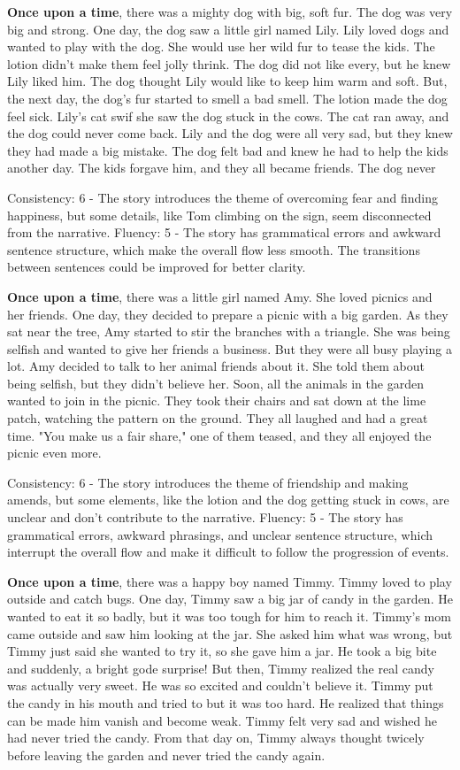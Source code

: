 \documentclass{article}
\begin{document}
\textbf{Once upon a time}, there was a mighty dog with big, soft fur. The dog was very big and strong. One day, the dog saw a little girl named Lily. Lily loved dogs and wanted to play with the dog. She would use her wild fur to tease the kids. The lotion didn't make them feel jolly thrink. The dog did not like every, but he knew Lily liked him. The dog thought Lily would like to keep him warm and soft. But, the next day, the dog's fur started to smell a bad smell. The lotion made the dog feel sick. Lily's cat swif she saw the dog  stuck in the cows. The cat ran away, and the dog could never come back. Lily and the dog were all very sad, but they knew they had made a big mistake. The dog felt bad and knew he had to help the kids another day. The kids forgave him, and they all became friends. The dog never

Consistency: 6 - The story introduces the theme of overcoming fear and finding happiness, but some details, like Tom climbing on the sign, seem disconnected from the narrative.
Fluency: 5 - The story has grammatical errors and awkward sentence structure, which make the overall flow less smooth. The transitions between sentences could be improved for better clarity.

\textbf{Once upon a time}, there was a little girl named Amy. She loved picnics and her friends. One day, they decided to prepare a picnic with a big garden. As they sat near the tree, Amy started to stir the branches with a triangle. She was being selfish and wanted to give her friends a business. But they were all busy playing a lot. Amy decided to talk to her animal friends about it. She told them about being selfish, but they didn't believe her. Soon, all the animals in the garden wanted to join in the picnic. They took their chairs and sat down at the lime patch, watching the pattern on the ground. They all laughed and had a great time. "You make us a fair share," one of them teased, and they all enjoyed the picnic even more.

Consistency: 6 - The story introduces the theme of friendship and making amends, but some elements, like the lotion and the dog getting stuck in cows, are unclear and don't contribute to the narrative.
Fluency: 5 - The story has grammatical errors, awkward phrasings, and unclear sentence structure, which interrupt the overall flow and make it difficult to follow the progression of events.

\textbf{Once upon a time}, there was a happy boy named Timmy. Timmy loved to play outside and catch bugs. One day, Timmy saw a big jar of candy in the garden. He wanted to eat it so badly, but it was too tough for him to reach it. Timmy's mom came outside and saw him looking at the jar. She asked him what was wrong, but Timmy just said she wanted to try it, so she gave him a jar. He took a big bite and suddenly, a bright gode surprise! But then, Timmy realized the real candy was actually very sweet. He was so excited and couldn't believe it. Timmy put the candy in his mouth and tried to but it was too hard. He realized that things can be made him vanish and become weak. Timmy felt very sad and wished he had never tried the candy. From that day on, Timmy always thought twicely before leaving the garden and never tried the candy again.
\end{document}
